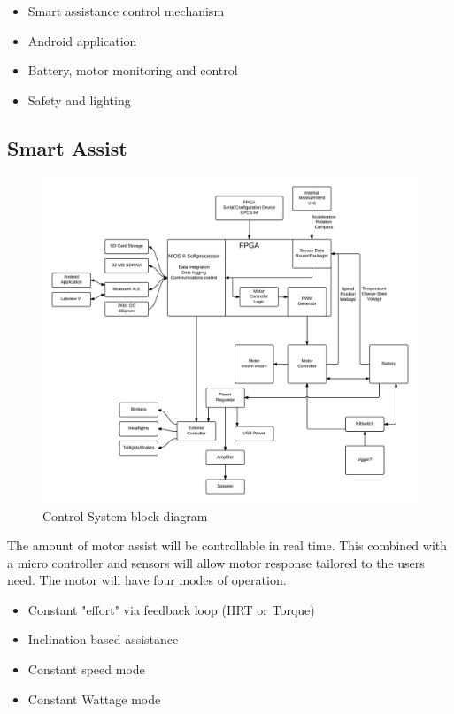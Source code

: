 \documentclass[12pt,article]{IEEEtran}
\begin{document}
	\begin{itemize}
		\item Smart assistance control mechanism
		\item Android application
		\item Battery, motor monitoring and control
		\item Safety and lighting
		
	\end{itemize}

	\subsection{{\bfseries Smart} Assist}
	
		\begin{figure}[t]
			\includegraphics[width=\textwidth]{SystemDiagram}
			\caption{Control System block diagram}
		\end{figure}
	
    	The amount of motor assist will be controllable in real time. This combined with a micro controller 
        and sensors will allow motor response tailored to the users need. The motor will have four modes of operation.
    	\begin{itemize}
    	\item Constant "effort" via feedback loop (HRT or Torque)
    	
    	\item Inclination based assistance
    
    	\item Constant speed mode \hfill
    
    	\item Constant Wattage mode \hfill
    	\end{itemize}
    	
\end{document}
